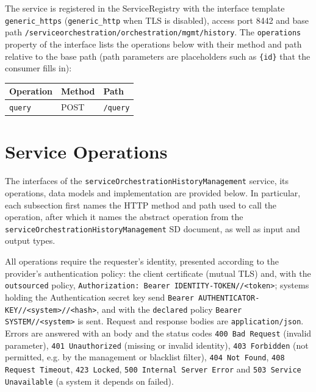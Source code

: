 \documentclass[a4paper]{arrowhead}
\newcommand{\mref}[2][]{{\textcolor{ArrowheadPurple}{\hyperref[sec:model:#2]{\ifstrempty{#1}{#2}{#1}}}}}
\begin{document}
The service is registered in the ServiceRegistry with the interface template \texttt{generic\_\allowbreak{}https} (\texttt{generic\_\allowbreak{}http} when TLS is disabled), access port 8442 and base path \texttt{/\allowbreak{}serviceorchestration/\allowbreak{}orchestration/\allowbreak{}mgmt/\allowbreak{}history}. The \texttt{operations} property of the interface lists the operations below with their method and path relative to the base path (path parameters are placeholders such as \texttt{\{id\}} that the consumer fills in):

\noindent\begin{longtable}{| p{5.2cm} | p{1.6cm} | p{8.4cm} |} \hline
\rowcolor{gray!33} Operation & Method & Path \\ \hline \endhead
\texttt{query} & POST & \texttt{/\allowbreak{}query} \\ \hline
\end{longtable}

\newpage

\section{Service Operations}
\label{sec:operations}

The interfaces of the \texttt{service\allowbreak{}Orchestration\allowbreak{}History\allowbreak{}Management} service, its operations, data models and implementation are provided below.
In particular, each subsection first names the HTTP method and path used to call the operation, after which it names the abstract operation from the \texttt{service\allowbreak{}Orchestration\allowbreak{}History\allowbreak{}Management} SD document, as well as input and output types.

All operations require the requester's identity, presented according to the provider's authentication policy: the client certificate (mutual TLS) and, with the \texttt{outsourced} policy, \texttt{Authorization: Bearer IDENTITY-TOKEN//<token>}; systems holding the Authentication secret key send \texttt{Bearer AUTHENTICATOR-KEY//<system>//<hash>}, and with the \texttt{declared} policy \texttt{Bearer SYSTEM//<system>} is sent. Request and response bodies are \texttt{application/json}.
Errors are answered with an \mref{ErrorMessage} body and the status codes \texttt{400 Bad Request} (invalid parameter), \texttt{401 Unauthorized} (missing or invalid identity), \texttt{403 Forbidden} (not permitted, e.g. by the management or blacklist filter), \texttt{404 Not Found}, \texttt{408 Request Timeout}, \texttt{423 Locked}, \texttt{500 Internal Server Error} and \texttt{503 Service Unavailable} (a system it depends on failed).
\end{document}
